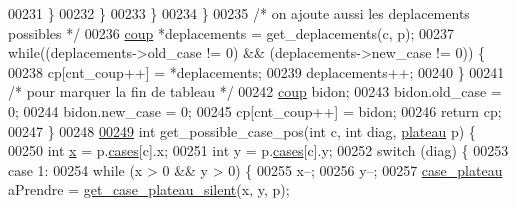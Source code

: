 \begin{DoxyCode}
00231                                 \}
00232                         \}
00233                 \}
00234         \}
00235         \textcolor{comment}{/* on ajoute aussi les deplacements possibles */}
00236         \hyperlink{structcoup}{coup} *deplacements = get\_deplacements(c, p);
00237         \textcolor{keywordflow}{while}((deplacements->old\_case != 0) && (deplacements->new\_case != 0)) \{
00238                 cp[cnt\_coup++] = *deplacements;
00239                 deplacements++;
00240         \}
00241         \textcolor{comment}{/* pour marquer la fin de tableau */}
00242         \hyperlink{structcoup}{coup} bidon;
00243         bidon.old\_case = 0;
00244         bidon.new\_case = 0;
00245         cp[cnt\_coup++] = bidon;
00246         \textcolor{keywordflow}{return} cp;
00247 \}
00248 
\hypertarget{regles_8c_source_l00249}{}\hyperlink{regles_8h_a69e7dc6de03ec30120b2a49ef6bb2f51}{00249} \textcolor{keywordtype}{int} get\_possible\_case\_pos(\textcolor{keywordtype}{int} c, \textcolor{keywordtype}{int} diag, \hyperlink{structplateau}{plateau} p) \{
00250         \textcolor{keywordtype}{int} \hyperlink{plateau_8h_a9e00f85b4b6ec2d8bdfbe94ff40f0eeeacab1e15e82c5976bfb476ddfe145263c}{x} = p.\hyperlink{structplateau_a6afaa60f594542e0d742b0c6d3223392}{cases}[c].x;
00251         \textcolor{keywordtype}{int} y = p.\hyperlink{structplateau_a6afaa60f594542e0d742b0c6d3223392}{cases}[c].y;
00252         \textcolor{keywordflow}{switch} (diag) \{
00253         \textcolor{keywordflow}{case} 1:
00254                 \textcolor{keywordflow}{while} (x > 0 && y > 0) \{
00255                         x--;
00256                         y--;
00257                         \hyperlink{structcase__plateau}{case_plateau} aPrendre = \hyperlink{plateau_8h_a60a8f706865d0ae9087f8d65d4667655}{get_case_plateau_silent}(x, y, p);
      

\end{DoxyCode}
